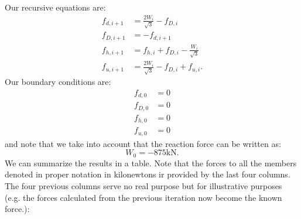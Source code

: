\documentclass{article}
\begin{document}
Our recursive equations are:
\begin{align}
    f_{d,i+1} &= \frac{2W_i}{\sqrt{3}}-f_{D,i} \\ 
    f_{D,i+1} &= -f_{d,i+1} \\
    f_{h,i+1} &= f_{h,i}+f_{D,i} - \frac{W_i}{\sqrt{3}} \\ 
    f_{u,i+1} &= \frac{2W_i}{\sqrt{3}}-f_{D,i}+f_{u,i}.
\end{align}Our boundary conditions are:
\begin{align}
    f_{d,0} &= 0 \\
    f_{D,0} &= 0 \\ 
    f_{h,0} &= 0 \\ 
    f_{u,0} &= 0
\end{align} 
and note that we take into account that the reaction force can be written as:
\begin{equation}
    W_0 = -875 \si{\kilo\newton}.
    \label{eq:}
\end{equation}
We can summarize the results in a table. Note that the forces to all the members denoted in proper notation in kilonewtons ir provided by the last four columns. The four previous columns serve no real purpose but for illustrative purposes (e.g. the forces calculated from the previous iteration now become the known force.):
\end{document}

